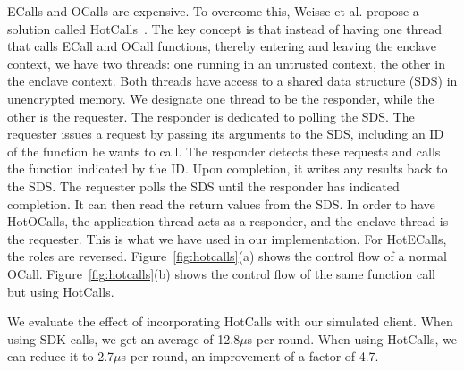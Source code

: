  ECalls and OCalls are expensive. To overcome this, Weisse et al. propose a solution called HotCalls~\cite{weisse2017regaining}. The key concept is that instead of having one thread that calls ECall and OCall functions, thereby entering and leaving the enclave context, we have two threads: one running in an untrusted context, the other in the enclave context. Both threads have access to a shared data structure (SDS) in unencrypted memory. We designate one thread to be the responder, while the other is the requester. The responder is dedicated to polling the SDS. The requester issues a request by passing its arguments to the SDS, including an ID of the function he wants to call. The responder detects these requests and calls the function indicated by the ID. Upon completion, it writes any results back to the SDS. The requester polls the SDS until the responder has indicated completion. It can then read the return values from the SDS. In order to have HotOCalls, the application thread acts as a responder, and the enclave thread is the requester. This is what we have used in our implementation. For HotECalls, the roles are reversed. Figure~\ref{fig:hotcalls}(a) shows the control flow of a normal OCall. Figure~\ref{fig:hotcalls}(b) shows the control flow of the same function call but using HotCalls.

We evaluate the effect of incorporating HotCalls with our simulated client. When using SDK calls, we get an average of 12.8$\mu$s per round. When using HotCalls, we can reduce it to 2.7$\mu$s per round, an improvement of a factor of 4.7.